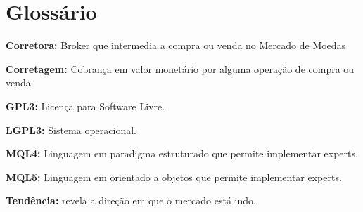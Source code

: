 \chapter{Glossário}

\textbf{Corretora:} Broker que intermedia a compra ou venda no Mercado de Moedas

\textbf{Corretagem:} Cobrança em valor monetário por alguma operação de compra ou venda.

\textbf{GPL3:} Licença para  Software Livre.

\textbf{LGPL3:} Sistema operacional.

\textbf{MQL4:} Linguagem em paradigma estruturado que permite implementar experts.

\textbf{MQL5:} Linguagem em orientado a objetos que permite implementar experts.

\textbf{Tendência:} revela a direção em que o mercado está indo.
